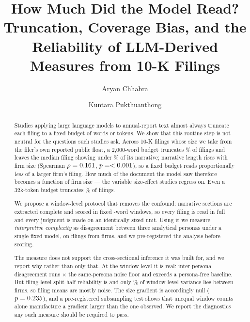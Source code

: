 \documentclass[sigconf,nonacm]{acmart}
\begin{document}
\title{How Much Did the Model Read? Truncation, Coverage Bias, and the
Reliability of LLM-Derived Measures from 10-K Filings}

\author{Aryan Chhabra}

\author{Kuntara Pukthuanthong}

\begin{abstract}
Studies applying large language models to annual-report text almost always
truncate each filing to a fixed budget of words or tokens. We show that this
routine step is not neutral for the questions such studies ask. Across
\ScaleNUsable{} 10-K filings whose size we take from the filer's own reported
public float, a 2,000-word budget truncates \ScaleTruncTwoK\% of filings and
leaves the median filing showing under \ScaleMedianReadTwoK\% of its narrative;
narrative length rises with firm size (Spearman $\rho = 0.161$,
$p = <0.001$), so a fixed budget reads proportionally \emph{less} of a larger
firm's filing. How much of the document the model saw therefore becomes a
function of firm size --- the variable size-effect studies regress on. Even a
32k-token budget truncates \ScaleTruncThirtyTwoK\% of filings.

We propose a window-level protocol that removes the confound: narrative sections
are extracted complete and scored in fixed \ChunkWords-word windows, so every
filing is read in full and every judgment is made on an identically sized unit.
Using it we measure \emph{interpretive complexity} as disagreement between three
analytical personas under a single fixed model, on \NFilings{} filings from
\NFirms{} firms, and we pre-registered the analysis before scoring.

The measure does not support the cross-sectional inference it was built for, and
we report why rather than only that. At the window level it is real: inter-persona
disagreement runs \NoiseRatio$\times$ the same-persona noise floor and exceeds a
persona-free baseline. But filing-level split-half reliability is
\SplitHalfSB{} and only \VarWithinFilingPct\% of window-level variance lies
between firms, so filing means are mostly noise. The size gradient is accordingly
null ($p = 0.235$), and a pre-registered subsampling test shows that unequal
window counts alone manufacture a gradient larger than the one observed. We report
the diagnostics any such measure should be required to pass.
\end{abstract}
\end{document}
